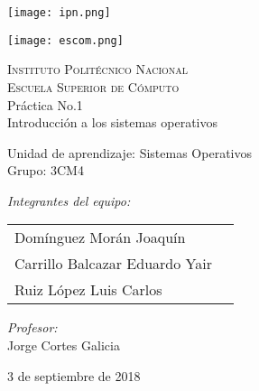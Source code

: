 \documentclass[12pt]{article}
\begin{document}
		\begin{titlepage}
			\begin{center}
				
				
				\noindent
				\begin{minipage}{0.5\textwidth}
					\begin{flushleft} \large
						\texttt{[image: ipn.png]}
					\end{flushleft}
				\end{minipage}%
				\begin{minipage}{0.55\textwidth}
					\begin{flushright} \large
						\texttt{[image: escom.png]}
					\end{flushright}
				\end{minipage}
				
				\textsc{\LARGE Instituto Politécnico Nacional}\\[0.5cm]
				
				\textsc{\Large Escuela Superior de Cómputo}\\[1cm]
				
				
				{ \huge Práctica No.1 \\[1cm] }
				{\huge Introducción a los sistemas operativos\\[1cm]}
				
				{ \Large Unidad de aprendizaje: Sistemas Operativos} \\[1cm]
				
				{ \Large Grupo: 3CM4 } \\[1cm]
				
				\noindent
				\begin{minipage}{0.5\textwidth}
					\begin{flushleft} \large
						\emph{Integrantes del equipo:}\\
						
						\begin{tabular}{ll}
					     Domínguez Morán Joaquín\\
					     Carrillo Balcazar Eduardo Yair\\
					     Ruiz López Luis Carlos\\
					\end{tabular}
					\end{flushleft}
				\end{minipage}%
				\begin{minipage}{0.5\textwidth}
					\begin{flushright} \large
						\emph{Profesor:} \\
						Jorge Cortes Galicia 
					\end{flushright}
				\end{minipage}
				
				\vfill
				
				{\large 3 de septiembre de 2018}
			\end{center}
		\end{titlepage}
	
\end{document}
